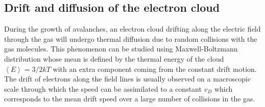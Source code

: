 	\subsection{Drift and diffusion of the electron cloud}
	\label{chapt4:ssec:electrons}
	
	During the growth of avalanches, an electron cloud drifting along the electric field through the gas will undergo thermal diffusion due to random collisions with the gas molecules. This phenomenon can be studied using Maxwell-Boltzmann distribution whose mean is defined by the thermal energy of the cloud $\left\langle E\right\rangle = 3/2 kT$ with an extra component coming from the constant drift motion. The drift of electrons along the field lines is usually observed on a macroscopic scale through which the speed can be assimilated to a constant $v_D$ which corresponds to the mean drift speed over a large number of collisions in the gas.
	
